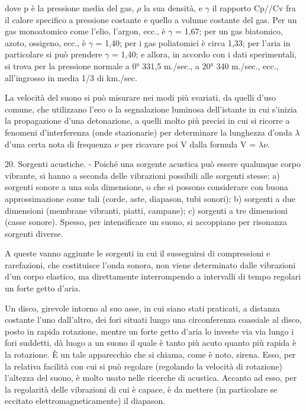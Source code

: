 \documentclass[a4paper]{article}
\begin{document}
dove p è la pressione media del gas, $\rho$ la sua densità, e $\gamma$ il rapporto Cp//Cv fra il calore specifico a pressione costante e quello a volume costante del gas. Per un gas monoatomico come l'elio, l'argon, ecc., è $\gamma$ = 1,67; per un gas biatomico, azoto, ossigeno, ecc., è $\gamma$ = 1,40; per i gas poliatomici è circa 1,33; per l'aria in particolare si può prendere $\gamma$ = 1,40; e allora, in accordo con i dati sperimentali, si trova per la pressione normale a 0° 331,5 m./sec., a 20° 340 m./sec., ecc., all'ingrosso in media 1/3 di km./sec.

La velocità del suono si può misurare nei modi più svariati, da quelli d'uso comune, che utilizzano l'eco o la segnalazione luminosa dell'istante in cui s'inizia la propagazione d'una detonazione, a quelli molto più precisi in cui si ricorre a fenomeni d'interferenza (onde stazionarie) per determinare la lunghezza d'onda $\lambda$ d'una certa nota di frequenza $\nu$ per ricavare poi V dalla formula V = $\lambda$$\nu$.

20. Sorgenti acustiche. - Poiché una sorgente acustica può essere qualunque corpo vibrante, si hanno a seconda delle vibrazioni possibili alle sorgenti stesse: a) sorgenti sonore a una sola dimensione, o che si possono considerare con buona approssimazione come tali (corde, aste, diapason, tubi sonori); b) sorgenti a due dimensioni (membrane vibranti, piatti, campane); c) sorgenti a tre dimensioni (casse sonore). Spesso, per intensificare un suono, si accoppiano per risonanza sorgenti diverse.

A queste vanno aggiunte le sorgenti in cui il susseguirsi di compressioni e rarefazioni, che costituisce l'onda sonora, non viene determinato dalle vibrazioni d'un corpo elastico, ma direttamente interrompendo a intervalli di tempo regolari un forte getto d'aria.

Un disco, girevole intorno al suo asse, in cui siano stati praticati, a distanza costante l'uno dall'altro, dei fori situati lungo una circonferenza coassiale al disco, posto in rapida rotazione, mentre un forte getto d'aria lo investe via via lungo i fori suddetti, dà luogo a un suono il quale è tanto più acuto quanto più rapida è la rotazione. È un tale apparecchio che si chiama, come è noto, sirena. Esso, per la relativa facilità con cui si può regolare (regolando la velocità di rotazione) l'altezza del suono, è molto usato nelle ricerche di acustica. Accanto ad esso, per la regolarità delle vibrazioni di cui è capace, è da mettere (in particolare se eccitato elettromagneticamente) il diapason.
\end{document}
